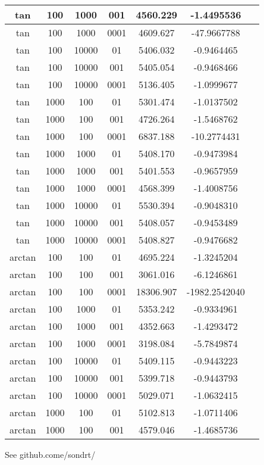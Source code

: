 \begin{tabular}{|c|c|c|c|c|c|c|}
\hline
tan 	& 100  		&	1000  	& 	001		&	 4560.229 	&	-1.4495536   	\\ 
\hline
tan 	& 100  		&	1000  	&	 0001	&	 4609.627 	&	-47.9667788	\\ 
\hline
tan 	& 100  		&	10000 	& 	01 		&	5406.032	&	 -0.9464465	\\ 
\hline
tan 	& 100  		&	10000 	& 	001 	&	5405.054	&	 -0.9468466	\\ 
\hline
tan 	& 100  		&	10000 	& 	0001 	&	5136.405	&	 -1.0999677	\\ 
\hline
tan 	& 1000 		&	 100  	& 	01 		&	5301.474	&	 -1.0137502	\\ 
\hline
tan 	& 1000 		&	 100  	& 	001 	&	4726.264	&	 -1.5468762	\\ 
\hline
tan 	& 1000 		&	 100  	& 	0001 	&	6837.188 	&	-10.2774431	\\ 
\hline
tan 	& 1000 		&	 1000 	 & 	01		&	 5408.170	&	 -0.9473984	\\ 
\hline
tan 	& 1000 		&	 1000 	 & 	001 	&	5401.553 	&	-0.9657959\\ 
\hline
tan 	& 1000 		&	 1000 	 & 	0001	&	 4568.399	&	 -1.4008756\\ 
\hline
tan 	& 1000 		&	 10000	 & 	01		&	 5530.394	&	 -0.9048310\\ 
\hline
tan 	& 1000 		&	 10000	 & 	001		&	 5408.057	&	 -0.9453489\\ 
\hline
tan 	& 1000 		&	 10000	 & 	0001	&	 5408.827	&	 -0.9476682\\ 
\hline
arctan& 100 &100	& 01& 4695.224& -1.3245204	\\ 
\hline
arctan& 100 &100	& 001 &3061.016 & -6.1246861	\\ 
\hline
arctan& 100 &100	& 0001 &18306.907& -1982.2542040	\\ 
\hline
arctan& 100 &1000 	&01 &5353.242& -0.9334961	\\ 
\hline
arctan& 100 &1000	& 001 &4352.663& -1.4293472	\\ 
\hline
arctan& 100 &1000	& 0001 &3198.084& -5.7849874	\\ 
\hline
arctan& 100 &10000	& 01 &5409.115& -0.9443223		\\ 
\hline
arctan& 100 &10000	& 001 &5399.718& -0.9443793	\\ 
\hline
arctan& 100 &10000 	&	0001 &5029.071 &-1.0632415	\\ 
\hline
arctan& 1000& 100 	&01& 5102.813& -1.0711406	\\ 
\hline
arctan& 1000& 100 	&001 &4579.046& -1.4685736	\\ 
\hline
\end{tabular}

See github.come/sondrt/